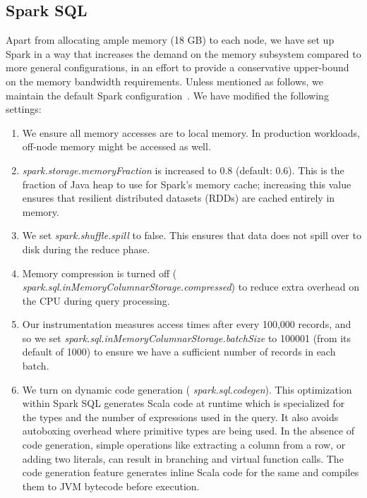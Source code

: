 \documentclass{sig-alternate-05-2015}
\begin{document}
\subsection{Spark SQL}

Apart from allocating ample memory (18 GB) to each node, we have set up Spark
in a way that increases the demand on the memory subsystem compared to more
general configurations, in an effort to provide a conservative upper-bound on
the memory bandwidth requirements.  Unless mentioned as follows, we maintain
the default Spark configuration~\cite{sparkConfig}.  We have modified
the following settings:

\begin{enumerate}

\item We ensure all memory accesses are to local memory.  In production
workloads, off-node memory might be accessed as well.

\item {\it spark.storage.memoryFraction} is increased to 0.8 (default: 0.6).
This is the fraction of Java heap to use for Spark's memory cache; increasing
this value ensures that resilient distributed datasets (RDDs) are cached
entirely in memory.

\item We set {\it spark.shuffle.spill} to false. This ensures that data does
not spill over to disk during the reduce phase.

\item Memory compression is turned off ({\it
spark.sql.\-inMemory\-Columnar\-Storage.\-compressed}) to reduce extra overhead
on the CPU during query processing.

\item Our instrumentation measures access times after every 100,000 records,
and so we set {\it spark.sql.\-inMemory\-Columnar\-Storage\-.batch\-Size} to
100001 (from its default of 1000) to ensure we have a sufficient number of
records in each batch.

\item We turn on dynamic code generation ({\it
spark.\-sql.\-code\-gen}).  This optimization within Spark SQL
generates Scala code at runtime which is specialized for the types and the
number of expressions used in the query. It also avoids autoboxing overhead
where primitive types are being used. In the absence of code generation, simple
operations like extracting a column from a row, or adding two literals, can
result in branching and virtual function calls. The code generation feature
generates inline Scala code for the same and compiles them to JVM bytecode
before execution.


\end{enumerate}
\end{document}
